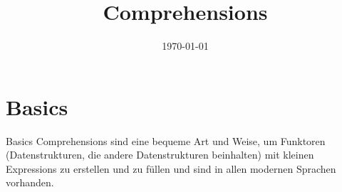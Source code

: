 


\newcommand{\topic}{
	Comprehensions
}

\title{\topic}
\supertitle{\course}
\date{\today}



\maketitle

\begin{frame}
	\tableofcontents
\end{frame}



\section{Basics}
\begin{frame}{Basics}
  Comprehensions sind eine bequeme Art und Weise, um Funktoren (Datenstrukturen, die andere Datenstrukturen beinhalten) mit kleinen Expressions zu erstellen und zu füllen und sind in allen modernen Sprachen vorhanden.
\end{frame}




